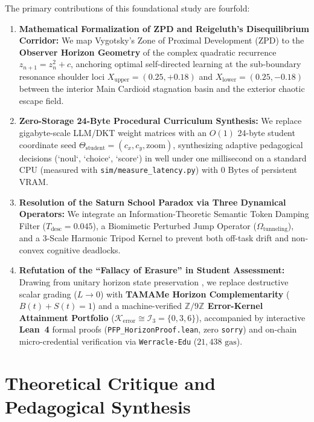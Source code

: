 \documentclass[10pt,twocolumn,a4paper]{article}
\begin{document}
The primary contributions of this foundational study are fourfold:
\begin{enumerate}[leftmargin=*,nosep]
    \item \textbf{Mathematical Formalization of ZPD and Reigeluth's Disequilibrium Corridor:} We map Vygotsky's Zone of Proximal Development (ZPD) \cite{vygotsky1978mind} to the \textbf{Observer Horizon Geometry} of the complex quadratic recurrence $z_{n+1} = z_n^2 + c$, anchoring optimal self-directed learning at the sub-boundary resonance shoulder loci $X_{\text{upper}} = (0.25, +0.18)$ and $X_{\text{lower}} = (0.25, -0.18)$ between the interior Main Cardioid stagnation basin and the exterior chaotic escape field.
    \item \textbf{Zero-Storage 24-Byte Procedural Curriculum Synthesis:} We replace gigabyte-scale LLM/DKT weight matrices with an $O(1)$ 24-byte student coordinate seed $\Theta_{\text{student}} = (c_x, c_y, \text{zoom})$, synthesizing adaptive pedagogical decisions (`noul`, `choice`, `score`) in well under one millisecond on a standard CPU (measured with \texttt{sim/measure\_latency.py}) with $0\text{ Bytes}$ of persistent VRAM.
    \item \textbf{Resolution of the Saturn School Paradox via Three Dynamical Operators:} We integrate an Information-Theoretic Semantic Token Damping Filter ($T_{\text{desc}} = 0.045$), a Biomimetic Perturbed Jump Operator ($\Omega_{\text{tunneling}}$), and a 3-Scale Harmonic Tripod Kernel to prevent both off-task drift and non-convex cognitive deadlocks.
    \item \textbf{Refutation of the ``Fallacy of Erasure'' in Student Assessment:} Drawing from unitary horizon state preservation \cite{dagli2026pagecurve}, we replace destructive scalar grading ($L \to 0$) with \textbf{TAMAMe Horizon Complementarity} ($B(t) + S(t) = 1$) and a machine-verified \textbf{$\mathbb{Z}/9\mathbb{Z}$ Error-Kernel Attainment Portfolio} ($\mathcal{K}_{\text{error}} \cong \mathcal{I}_3 = \{0, 3, 6\}$), accompanied by interactive \textbf{Lean~4} formal proofs (\texttt{PFP\_HorizonProof.lean}, zero \texttt{sorry}) and on-chain micro-credential verification via \texttt{Werracle-Edu} ($21,438\text{ gas}$).
\end{enumerate}

\section{Theoretical Critique and Pedagogical Synthesis}
\end{document}
